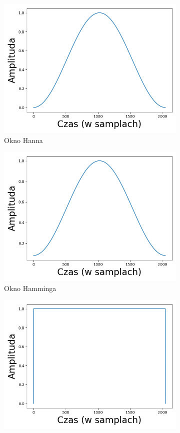 \documentclass[12pt,a4paper,twoside]{mwart}
\begin{document}
\begin{figure}[t]
  \begin{subfigure}{1.\textwidth}
    \centering
    \includegraphics[width=.49\linewidth]{images/windowFunctions/HannWindow.png}
    \caption{Okno Hanna}
  \end{subfigure}
  \newline
  \begin{subfigure}{0.5\textwidth}
    \includegraphics[width=1.\linewidth]{images/windowFunctions/HammingWindow.png}
    \caption{Okno Hamminga}
  \end{subfigure}
  \begin{subfigure}{0.49\textwidth}
    \includegraphics[width=1.\linewidth]{images/windowFunctions/RectangleWindow.png}

\end{subfigure}
\end{figure}
\end{document}
